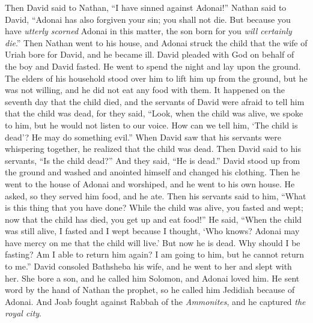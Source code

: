\begin{biblechapter}
 Then David said to Nathan, “I have sinned against Adonai!” Nathan said to David, “Adonai has also forgiven your sin; you shall not die.
\verse But because you have \textit{utterly scorned} Adonai in this matter, the son born for you \textit{will certainly die}.”
\verse Then Nathan went to his house, and Adonai struck the child that the wife of Uriah bore for David, and he became ill.
\verse David pleaded with God on behalf of the boy and David fasted. He went to spend the night and lay upon the ground.
\verse The elders of his household stood over him to lift him up from the ground, but he was not willing, and he did not eat any food with them.
\verse It happened on the seventh day that the child died, and the servants of David were afraid to tell him that the child was dead, for they said, “Look, when the child was alive, we spoke to him, but he would not listen to our voice. How can we tell him, ‘The child is dead’? He may do something evil.”
\verse When David saw that his servants were whispering together, he realized that the child was dead. Then David said to his servants, “Is the child dead?” And they said, “He is dead.”
\verse David stood up from the ground and washed and anointed himself and changed his clothing. Then he went to the house of Adonai and worshiped, and he went to his own house. He asked, so they served him food, and he ate.
\verse Then his servants said to him, “What is this thing that you have done? While the child was alive, you fasted and wept; now that the child has died, you get up and eat food!”
\verse He said, “When the child was still alive, I fasted and I wept because I thought, ‘Who knows? Adonai may have mercy on me that the child will live.’
\verse But now he is dead. Why should I be fasting? Am I able to return him again? I am going to him, but he cannot return to me.”
\verse David consoled Bathsheba his wife, and he went to her and slept with her. She bore a son, and he called him Solomon, and Adonai loved him.
\verse He sent word by the hand of Nathan the prophet, so he called him Jedidiah because of Adonai.
 And Joab fought against Rabbah of the \textit{Ammonites}, and he captured \textit{the royal city}.

\end{biblechapter}
